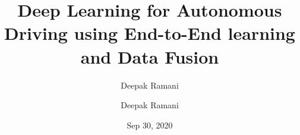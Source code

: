 \title{Deep Learning for Autonomous Driving using End-to-End learning and Data Fusion}
\author{Deepak Ramani}
\signature{Deepak Ramani}
\date{Sep 30, 2020}


